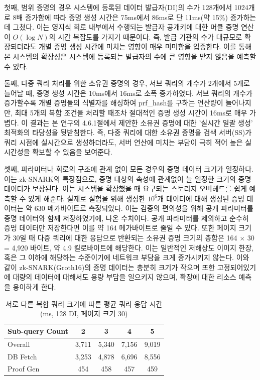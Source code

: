 \bigskip

첫째, 범위 증명의 경우 시스템에 등록된 데이터 발급자(DI)의 수가 128개에서 1024개로 8배 증가함에 따라 증명 생성 시간은 75ms에서 86ms로 단 11ms(약 15\%) 증가하는 데 그쳤다. 이는 영지식 회로 내부에서 수행되는 발급자 공개키에 대한 머클 증명 연산이 $O(\log{N})$의 시간 복잡도를 가지기 때문이다. 즉, 발급 기관의 수가 대규모로 확장되더라도 개별 증명 생성 시간에 미치는 영향이 매우 미미함을 입증한다. 이를 통해 본 시스템의 확장성은 시스템에 등록되는 발급자의 수에 큰 영향을 받지 않음을 예측할 수 있다.

\bigskip

둘째, 다중 쿼리 처리를 위한 소유권 증명의 경우, 서브 쿼리의 개수가 2개에서 5개로 늘어날 때, 증명 생성 시간은 10ms에서 16ms로 소폭 증가하였다. 서브 쿼리의 개수가 증가할수록 개별 증명들의 식별자를 해싱하여 prf\_hash를 구하는 연산량이 늘어나지만, 최대 5개의 복합 조건을 처리할 때조차 절대적인 증명 생성 시간이 16ms로 매우 가볍다. 이 결과는 본 연구의 4.6.1절에서 제안한 소유권 증명에 대한 '실시간 일괄 생성' 최적화의 타당성을 뒷받침한다. 즉, 다중 쿼리에 대한 소유권 증명을 검색 서버(SS)가 쿼리 시점에 실시간으로 생성하더라도, 서버 연산에 미치는 부담이 극히 적어 높은 실시간성을 확보할 수 있음을 보여준다.

\bigskip

셋째, 파라미터나 회로의 구조에 관계 없이 모든 경우의 증명 데이터 크기가 일정하다. 이는 zk-SNARK의 특장점으로, 증명 대상의 속성에 관계없이 늘 일정한 크기의 증명 데이터가 보장된다. 이는 시스템을 확장했을 때 요구되는 스토리지 오버헤드를 쉽게 예측할 수 있게 해준다. 실제로 실험을 위해 생성한 $10^6$개 데이터에 대해 생성된 증명 데이터는 약 630 메가바이트로 측정되었다. 이는 검증의 편의성을 위해 공개 파라미터를 증명 데이터와 함께 저장하였기에, 나온 수치이다. 공개 파라미터를 제외하고 순수히 증명 데이터만 저장한다면 이를 약 164 메가바이트로 줄일 수 있다. 또한 페이지 크기가 30일 때 다중 쿼리에 대한 응답으로 반환되는 소유권 증명 크기의 총합은 164 $\times$ 30 = 4,920 바이트, 약 4.9 킬로바이트에 해당한다. 이는 일반적인 저해상도 이미지 한장, 혹은 그 이하에 해당하는 수준이기에 네트워크 부담을 크게 증가시키지 않는다. 이와 같이 zk-SNARK(Groth16)의 증명 데이터는 충분히 크기가 작으며 또한 고정되어있기에 대량의 데이터에 대해서도 용량 부담을 일으키지 않으며, 확장에 대한 리소스 예측을 용이하게 한다.

\bigskip

\begin{table}[h]
    \centering
    \footnotesize
    \caption{서로 다른 복합 쿼리 크기에 따른 평균 쿼리 응답 시간(ms, 128 DI, 페이지 크기 30)}
    \label{tab:placeholder}
    \begin{tabular}{l|c|c|c|c}
        \hline
        Sub-query Count & 2 & 3 & 4 & 5 \\
        \hline
        Overall & 3,711 & 5,340 & 7,156 & 9,019 \\
        DB Fetch & 3,253 & 4,878 & 6,696 & 8,556 \\
        Proof Gen & 454 & 458 & 457 & 459 \\
        \hline
    \end{tabular}
\end{table}

